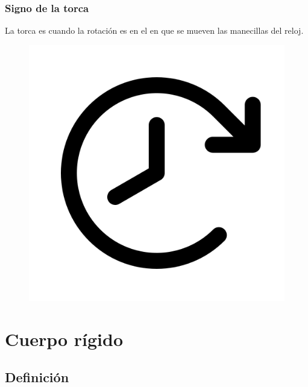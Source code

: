\documentclass[14pt]{beamer}
\begin{document}
\begin{frame}
\frametitle{Signo de la torca}
La torca es  cuando la rotación es en el  en que se mueven las manecillas del reloj.
\begin{figure}
    \centering
    \includegraphics[scale=0.18]{Imagenes/DominaBach_06.png}
\end{figure}
\end{frame}

\section{Cuerpo rígido}
\subsection{Definición}
\end{document}
